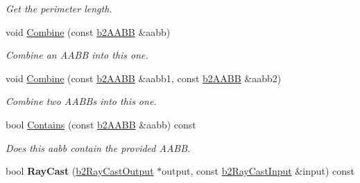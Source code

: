 \begin{DoxyCompactItemize}
\begin{DoxyCompactList}\small\item\em Get the perimeter length. \end{DoxyCompactList}\item 
void \hyperlink{structb2_a_a_b_b_ad551edba62d2ad6094672a9ba3e26496}{Combine} (const \hyperlink{structb2_a_a_b_b}{b2\+A\+A\+BB} \&aabb)\hypertarget{structb2_a_a_b_b_ad551edba62d2ad6094672a9ba3e26496}{}\label{structb2_a_a_b_b_ad551edba62d2ad6094672a9ba3e26496}

\begin{DoxyCompactList}\small\item\em Combine an A\+A\+BB into this one. \end{DoxyCompactList}\item 
void \hyperlink{structb2_a_a_b_b_a34b9c7d824df845c10caa9c12ae90452}{Combine} (const \hyperlink{structb2_a_a_b_b}{b2\+A\+A\+BB} \&aabb1, const \hyperlink{structb2_a_a_b_b}{b2\+A\+A\+BB} \&aabb2)\hypertarget{structb2_a_a_b_b_a34b9c7d824df845c10caa9c12ae90452}{}\label{structb2_a_a_b_b_a34b9c7d824df845c10caa9c12ae90452}

\begin{DoxyCompactList}\small\item\em Combine two A\+A\+B\+Bs into this one. \end{DoxyCompactList}\item 
bool \hyperlink{structb2_a_a_b_b_aba5fc112e3c8d05e034a21d95fc37704}{Contains} (const \hyperlink{structb2_a_a_b_b}{b2\+A\+A\+BB} \&aabb) const \hypertarget{structb2_a_a_b_b_aba5fc112e3c8d05e034a21d95fc37704}{}\label{structb2_a_a_b_b_aba5fc112e3c8d05e034a21d95fc37704}

\begin{DoxyCompactList}\small\item\em Does this aabb contain the provided A\+A\+BB. \end{DoxyCompactList}\item 
bool {\bfseries Ray\+Cast} (\hyperlink{structb2_ray_cast_output}{b2\+Ray\+Cast\+Output} $\ast$output, const \hyperlink{structb2_ray_cast_input}{b2\+Ray\+Cast\+Input} \&input) const \hypertarget{structb2_a_a_b_b_a8a9a3dbc76c1175e80bb767437240ef5}{}\label{structb2_a_a_b_b_a8a9a3dbc76c1175e80bb767437240ef5}

\end{DoxyCompactItemize}
